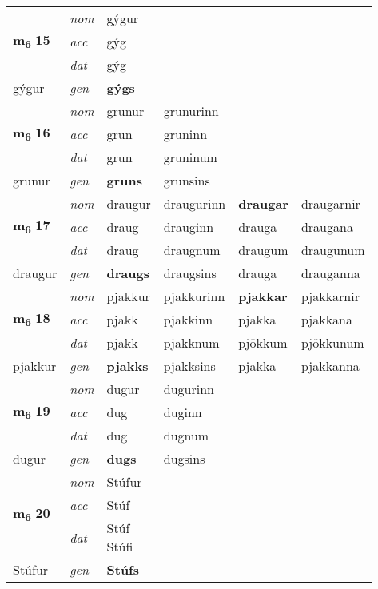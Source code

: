 \begin{longtable}[l]{X>{\footnotesize\itshape}XXXXX}
\multirow{3}{*}{{{\textbf{m{\textsubscript{6}}} \Large{\textbf{15}}}}}  
 & nom & gýgur &     & \textbf{} &   \\*
 & acc & gýg  &    &   &  \\*
 & dat & gýg &    &  &  \\*
 {\footnotesize{gýgur}} &  gen & \textbf{gýgs}  &   &  &  \\
\cmidrule{1-6}


\multirow{3}{*}{{{\textbf{m{\textsubscript{6}}} \Large{\textbf{16}}}}}  
 & nom & grunur & grunurinn    & \textbf{} &   \\*
 & acc & grun  & gruninn   &   &  \\*
 & dat & grun & gruninum   &  &  \\*
 {\footnotesize{grunur}} &  gen & \textbf{gruns}  & grunsins  &  &  \\
\cmidrule{1-6}


\multirow{3}{*}{{{\textbf{m{\textsubscript{6}}} \Large{\textbf{17}}}}}  
 & nom & draugur & draugurinn    & \textbf{draugar} & draugarnir  \\*
 & acc & draug  & drauginn   & drauga  & draugana \\*
 & dat & draug & draugnum   & draugum & draugunum \\*
 {\footnotesize{draugur}} &  gen & \textbf{draugs}  & draugsins  & drauga & drauganna \\
\cmidrule{1-6}


\multirow{3}{*}{{{\textbf{m{\textsubscript{6}}} \Large{\textbf{18}}}}}  
 & nom & pjakkur & pjakkurinn    & \textbf{pjakkar} & pjakkarnir  \\*
 & acc & pjakk  & pjakkinn   & pjakka  & pjakkana \\*
 & dat & pjakk & pjakknum   & pjökkum & pjökkunum \\*
 {\footnotesize{pjakkur}} &  gen & \textbf{pjakks}  & pjakksins  & pjakka & pjakkanna \\
\cmidrule{1-6}


\multirow{3}{*}{{{\textbf{m{\textsubscript{6}}} \Large{\textbf{19}}}}}  
 & nom & dugur & dugurinn    & \textbf{} &   \\*
 & acc & dug  & duginn   &   &  \\*
 & dat & dug & dugnum   &  &  \\*
 {\footnotesize{dugur}} &  gen & \textbf{dugs}  & dugsins  &  &  \\
\cmidrule{1-6}


\multirow{3}{*}{{{\textbf{m{\textsubscript{6}}} \Large{\textbf{20}}}}}  
 & nom & Stúfur &     & \textbf{} &   \\*
 & acc & Stúf  &    &   &  \\*
 & dat & \specialcell{Stúf\\ Stúfi} &    &  &  \\*
 {\footnotesize{Stúfur}} &  gen & \textbf{Stúfs}  &   &  &  \\
\cmidrule{1-6}



\end{longtable}

